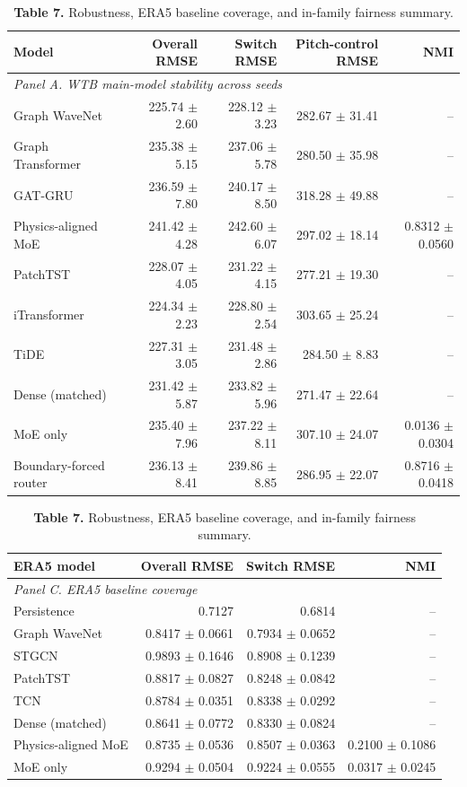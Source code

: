 \begin{table}[t]
\centering
\scriptsize
\setlength{\tabcolsep}{4pt}
\renewcommand{\arraystretch}{1.00}
\caption*{\textbf{Table 7.} Robustness, ERA5 baseline coverage, and in-family fairness summary.}
\begin{tabular}{lrrrr}
\toprule
Model & Overall RMSE & Switch RMSE & Pitch-control RMSE & NMI \\
\midrule
\multicolumn{5}{l}{\textit{Panel A. WTB main-model stability across seeds}} \\
Graph WaveNet & 225.74 $\pm$ 2.60 & 228.12 $\pm$ 3.23 & 282.67 $\pm$ 31.41 & -- \\
Graph Transformer & 235.38 $\pm$ 5.15 & 237.06 $\pm$ 5.78 & 280.50 $\pm$ 35.98 & -- \\
GAT-GRU & 236.59 $\pm$ 7.80 & 240.17 $\pm$ 8.50 & 318.28 $\pm$ 49.88 & -- \\
Physics-aligned MoE & 241.42 $\pm$ 4.28 & 242.60 $\pm$ 6.07 & 297.02 $\pm$ 18.14 & 0.8312 $\pm$ 0.0560 \\
PatchTST & 228.07 $\pm$ 4.05 & 231.22 $\pm$ 4.15 & 277.21 $\pm$ 19.30 & -- \\
iTransformer & 224.34 $\pm$ 2.23 & 228.80 $\pm$ 2.54 & 303.65 $\pm$ 25.24 & -- \\
TiDE & 227.31 $\pm$ 3.05 & 231.48 $\pm$ 2.86 & 284.50 $\pm$ 8.83 & -- \\
Dense (matched) & 231.42 $\pm$ 5.87 & 233.82 $\pm$ 5.96 & 271.47 $\pm$ 22.64 & -- \\
MoE only & 235.40 $\pm$ 7.96 & 237.22 $\pm$ 8.11 & 307.10 $\pm$ 24.07 & 0.0136 $\pm$ 0.0304 \\
Boundary-forced router & 236.13 $\pm$ 8.41 & 239.86 $\pm$ 8.85 & 286.95 $\pm$ 22.07 & 0.8716 $\pm$ 0.0418 \\
\bottomrule
\end{tabular}

\vspace{0.25em}
\begin{tabular}{lrrr}
\toprule
ERA5 model & Overall RMSE & Switch RMSE & NMI \\
\midrule
\multicolumn{4}{l}{\textit{Panel C. ERA5 baseline coverage}} \\
Persistence & 0.7127 & 0.6814 & -- \\
Graph WaveNet & 0.8417 $\pm$ 0.0661 & 0.7934 $\pm$ 0.0652 & -- \\
STGCN & 0.9893 $\pm$ 0.1646 & 0.8908 $\pm$ 0.1239 & -- \\
PatchTST & 0.8817 $\pm$ 0.0827 & 0.8248 $\pm$ 0.0842 & -- \\
TCN & 0.8784 $\pm$ 0.0351 & 0.8338 $\pm$ 0.0292 & -- \\
Dense (matched) & 0.8641 $\pm$ 0.0772 & 0.8330 $\pm$ 0.0824 & -- \\
Physics-aligned MoE & 0.8735 $\pm$ 0.0536 & 0.8507 $\pm$ 0.0363 & 0.2100 $\pm$ 0.1086 \\
MoE only & 0.9294 $\pm$ 0.0504 & 0.9224 $\pm$ 0.0555 & 0.0317 $\pm$ 0.0245 \\
\bottomrule
\end{tabular}


\end{table}
